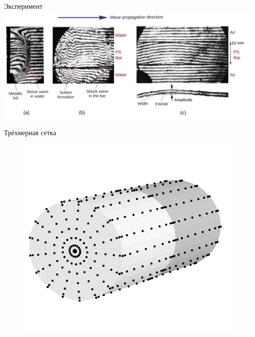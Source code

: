 \documentclass[usenames,dvipsnames]{beamer}
\begin{document}
\begin{frame}{Эксперимент}
\includegraphics[width=1.05\linewidth]{figures/trio_2_300_2}
\end{frame}


\begin{frame}{Трёхмерная сетка}
\begin{figure}[h!]
		\includegraphics[width=.5\linewidth]{figures/Grid3D}
\end{figure}
\end{frame}
\end{document}
